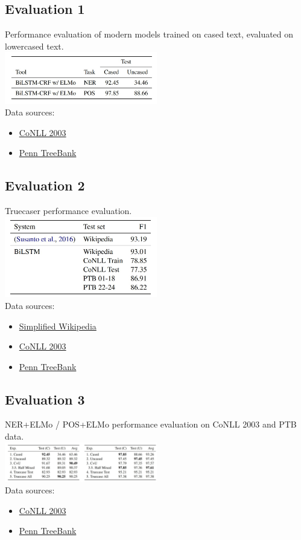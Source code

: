 \documentclass{article}
\begin{document}
\subsection*{Evaluation 1}
Performance evaluation of modern models trained on cased text, evaluated on lowercased text.
\\
\includegraphics[width=0.5\textwidth]{stat1}
\\
Data sources:
\begin{itemize}
	\item \href{https://dl.acm.org/doi/10.3115/1119176.1119195}{CoNLL 2003}
	\item \href{https://www.seas.upenn.edu/~pdtb/}{Penn TreeBank}
\end{itemize}


\subsection*{Evaluation 2}
Truecaser performance evaluation.
\\
\includegraphics[width=0.5\textwidth]{stat2}
\\
Data sources:
\begin{itemize}
	\item \href{https://cs.pomona.edu/~dkauchak/simplification/}{Simplified Wikipedia}
	\item \href{https://dl.acm.org/doi/10.3115/1119176.1119195}{CoNLL 2003}
	\item \href{https://www.seas.upenn.edu/~pdtb/}{Penn TreeBank}
\end{itemize}


\subsection*{Evaluation 3} 
NER+ELMo / POS+ELMo performance evaluation on CoNLL 2003 and PTB data.
\\
\includegraphics[width=0.5\textwidth]{stat3}
\\
Data sources:
\begin{itemize}
	\item \href{https://dl.acm.org/doi/10.3115/1119176.1119195}{CoNLL 2003}
	\item \href{https://www.seas.upenn.edu/~pdtb/}{Penn TreeBank}
\end{itemize}
\end{document}
